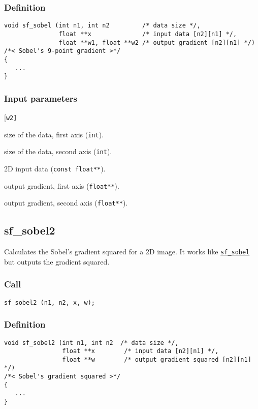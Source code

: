 \subsubsection*{Definition}
\begin{verbatim}
void sf_sobel (int n1, int n2         /* data size */, 
               float **x              /* input data [n2][n1] */, 
               float **w1, float **w2 /* output gradient [n2][n1] */)
/*< Sobel's 9-point gradient >*/
{
   ...
}
\end{verbatim}

\subsubsection*{Input parameters}
\begin{desclist}{\tt }{\quad}[\tt w2]
   \setlength\itemsep{0pt}
   \item[n1]	 size of the data, first axis (\texttt{int}).  
   \item[n2]	 size of the data, second axis (\texttt{int}). 
   \item[x]  2D input data (\texttt{const float**}).  
   \item[w1] output gradient, first axis (\texttt{float**}).  
   \item[w2] output gradient, second axis (\texttt{float**}).  
\end{desclist}




\subsection{{sf\_sobel2}}\label{sec:sf_sobel2}
Calculates the Sobel's gradient squared for a 2D image. It works like \hyperref[sec:sf_sobel]{\texttt{sf\_sobel}} but outputs the gradient squared.

\subsubsection*{Call}
\begin{verbatim}sf_sobel2 (n1, n2, x, w);\end{verbatim}

\subsubsection*{Definition}
\begin{verbatim}
void sf_sobel2 (int n1, int n2  /* data size */, 
                float **x        /* input data [n2][n1] */, 
                float **w        /* output gradient squared [n2][n1] */)
/*< Sobel's gradient squared >*/
{
   ...
}
\end{verbatim}

